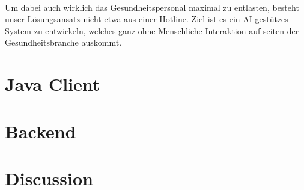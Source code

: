 \documentclass[11pt, letterpaper]{article}
\begin{document}
        \paragraph{}
            Um dabei auch wirklich das Gesundheitspersonal maximal zu entlasten, besteht unser
            Lösungsansatz nicht etwa aus einer Hotline. Ziel ist es ein AI gestützes System zu entwickeln,
            welches ganz ohne Menschliche Interaktion auf seiten der Gesundheitsbranche auskommt.

\newpage

\section{Java Client}

\newpage

\section{Backend}

\newpage

\section{Discussion}
\end{document}

